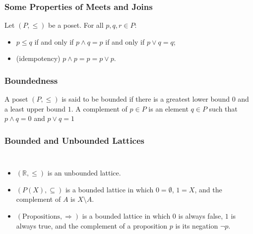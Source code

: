 \documentclass{beamer}
\begin{document}
\begin{frame}

	\frametitle{Some Properties of Meets and Joins}
	
	\begin{theorem}
	
		Let $(P,\leq)$ be a poset. For all $p,q,r\in P$:
		\begin{itemize}
			\item $p\leq q$ if and only if $p\wedge q = p$ if and only if $p\vee q=q$;
			\item (idempotency) $p\wedge p=p=p\vee p$.
		\end{itemize}			
	
	\end{theorem}

\end{frame}

\begin{frame}

	\frametitle{Boundedness}
	
	\begin{definition}
		
		A poset $(P,\leq)$ is said to be bounded if there is a greatest lower bound $0$ and a least upper bound $1$. A complement of $p\in P$ is an element $q\in P$ such that $p\wedge q=0$ and $p\vee q=1$		
		
	\end{definition}

\end{frame}

\begin{frame}

	\frametitle{Bounded and Unbounded Lattices}
	
	\begin{example}
		\begin{columns}
			\begin{itemize}
				\item $(\mathbb{R},\leq)$ is an unbounded lattice.
				\item $(P(X),\subseteq)$ is a bounded lattice in which $0=\emptyset$, $1=X$, and the complement of $A$ is $X\setminus A$.
				\item $(\text{Propositions},\Rightarrow)$ is a bounded lattice in which $0$ is always false, $1$ is always true, and the complement of a proposition $p$ is its negation $\neg p$.
			\end{itemize}
		\end{columns}
	\end{example}

\end{frame}
\end{document}
